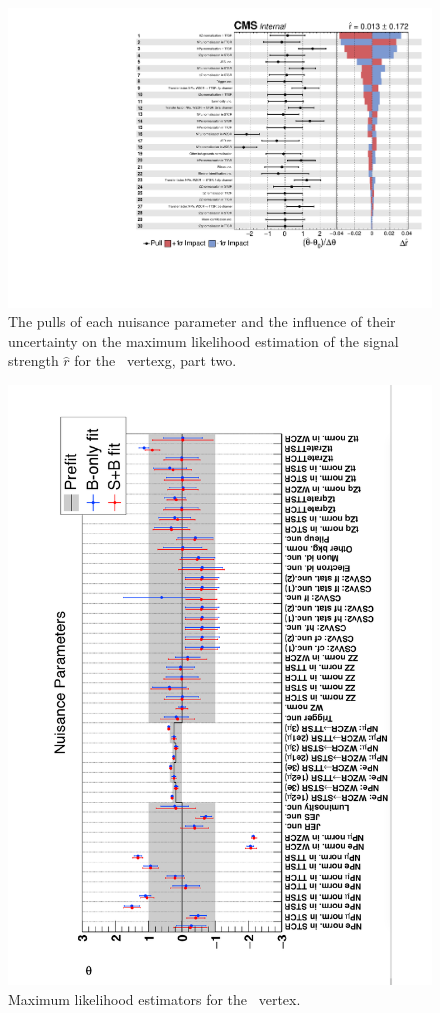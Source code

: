 \begin{figure}[htbp] 
	\centering
	\includegraphics[page=2,width=.99\linewidth,keepaspectratio]{6_Search/Figures/impact/171102Zct.pdf}
	\caption{The pulls of each nuisance parameter and the influence of their uncertainty on the maximum likelihood estimation of the signal strength $\hat{r}$ for the \Zct\ vertexg, part two.}
	\label{fig:impactsZct}
\end{figure}
\begin{figure}[htbp]
	\centering
	\includegraphics[width=1.\linewidth]{6_Search/Figures/impact/171102ZutMLE.pdf}
	\caption{Maximum likelihood estimators for the \Zut\ vertex.}
	\label{fig:171102zutmle}
\end{figure}
